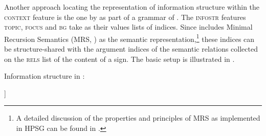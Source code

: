 \documentclass[output=paper
                ,modfonts
                ,nonflat
	        ,collection
	        ,collectionchapter
	        ,collectiontoclongg
 	        ,biblatex
                ,babelshorthands
                ,newtxmath
                ,draftmode
                ,colorlinks, citecolor=brown
]{./langsci/langscibook}
\begin{document}
Another approach locating the representation of information structure
within the \textsc{context} feature is the one by
\cite{Paggio2009a-u} as part of a grammar of . The
\textsc{infostr} features \textsc{topic}, \textsc{focus} and
\textsc{bg} take as their values lists of indices. Since
\cite{Paggio2009a-u} includes Minimal Recursion Semantics (MRS,
\citealt{CFPS2005a}) as the semantic representation,\footnote{A detailed
  discussion of the properties and principles of MRS as implemented in
  HPSG can be found in .} these indices
can be structure-shared with the argument indices of the semantic
relations collected on the \textsc{rels} list of the content of a
sign. The basic setup is illustrated in .

\ea\label{fig:paggio-infostr}
Information structure in \cite[149]{Paggio2009a-u}:\\
        \leavevmode
    \begin{avm}
    [\tp{sign}\\
     synsem|local|context|infostr & [focus & list-of-indices\\
                                     topic & list-of-indices\\
                                     bg & list-of-indices]
    ]     
    \end{avm}
\z
\end{document}
